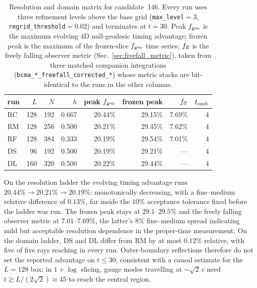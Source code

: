 \documentclass[twocolumn,floatfix,aps,prd,nofootinbib]{revtex4-2}
\begin{document}
\begin{table}[tbp]
\caption{Resolution and domain matrix for candidate~146. Every run uses
three refinement levels above the base grid (\texttt{max\_level}$=3$,
\texttt{regrid\_threshold}$=0.02$) and terminates at $t=30$. Peak
$f_{\rm geo}$ is the maximum evolving 4D null-geodesic timing advantage;
frozen peak is the maximum of the frozen-slice $f_{\rm geo}$ time series;
$f_{\rm ff}$ is the freely falling observer metric
(Sec.~\ref{sec:freefall_metric}), taken from three matched companion
integrations (\texttt{bcma\_*\_freefall\_corrected\_*}) whose metric stacks are
bit-identical to the runs in the other columns.}
\label{tab:matrix}
\begin{ruledtabular}
\begin{tabular}{lrrrrrrr}
run & $L$ & $N$ & $h$ & peak $f_{\rm geo}$ & frozen peak & $f_{\rm ff}$ & $t_{\rm emit}$ \\
\hline
RC & 128 & 192 & 0.667 & 20.44\% & 29.15\% & 7.69\% & 4 \\
RM & 128 & 256 & 0.500 & 20.21\% & 29.45\% & 7.62\% & 4 \\
RF & 128 & 384 & 0.333 & 20.19\% & 29.54\% & 7.01\% & 4 \\
DS & 96 & 192 & 0.500 & 20.19\% & 29.21\% & --- & 4 \\
DL & 160 & 320 & 0.500 & 20.22\% & 29.44\% & --- & 4 \\
\end{tabular}
\end{ruledtabular}
\end{table}

On the resolution ladder the evolving timing advantage runs
$20.44\%\to20.21\%\to20.19\%$: monotonically decreasing, with a fine--medium
relative difference of $0.13\%$, far inside the $10\%$ acceptance tolerance
fixed before the ladder was run. The frozen peak stays at $29.1$--$29.5\%$ and
the freely falling observer metric at $7.01$--$7.69\%$, the latter's $8\%$
fine--medium spread indicating mild but acceptable resolution dependence in the
proper-time measurement. On the domain ladder, DS and DL differ from RM by at
most $0.12\%$ relative, with five of five rays reaching in every run.
Outer-boundary reflections therefore do not set the reported advantage on
$t\le30$, consistent with a causal estimate for the $L=128$ box: in
$1{+}\log$ slicing, gauge modes travelling at ${\sim}\sqrt{2}\,c$ need
$t\gtrsim L/(2\sqrt{2})\approx45$ to reach the central region.
\end{document}
